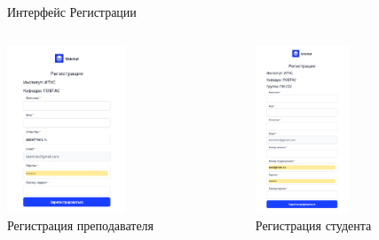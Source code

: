 \documentclass[aspectratio=169]{beamer}
\begin{document}
\begin{frame}{Интерфейс Регистрации}
\begin{columns}
    \begin{column}{0.45\textwidth}
        \centering
        \includegraphics[height=5cm]{static/RegTeacherPage.png} \\
        \small Регистрация преподавателя
    \end{column}
    \begin{column}{0.45\textwidth}
        \centering
        \includegraphics[height=5cm]{static/RegStudentPage.png} \\
        \small Регистрация студента
    \end{column}
\end{columns}
\end{frame}
\end{document}
